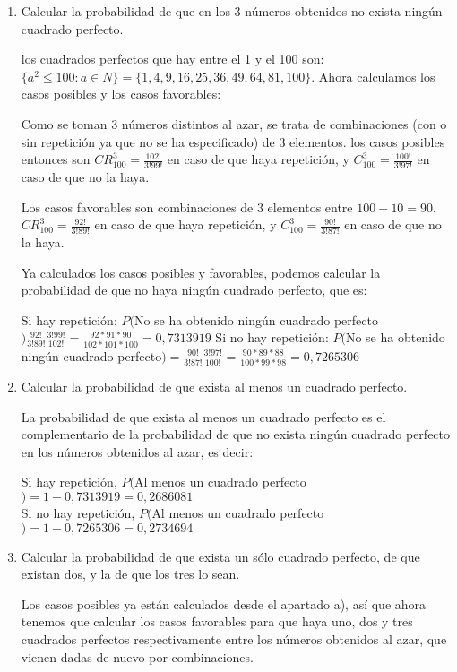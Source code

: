 \documentclass[a4paper,12pt]{article}
\begin{document}
\begin{enumerate}
    \begin{enumerate}[label=\alph*)]
    \item Calcular la probabilidad de que en los 3 números obtenidos no exista ningún cuadrado perfecto.

    los cuadrados perfectos que hay entre el 1 y el 100 son: $\{ a^2 \leq 100 : a \in N\} =\{ 1,4, 9, 16,25, 36, 49,64, 81, 100\}$. Ahora calculamos los casos posibles y los casos favorables:

    Como se toman 3 números distintos al azar, se trata de combinaciones (con o sin repetición ya que no se ha especificado) de 3 elementos. los casos posibles entonces son $CR_{100}^3=\frac{102!}{3!99!}$ en caso de que haya repetición, y $C_{100}^3=\frac{100!}{3!97!}$ en caso de que no la haya.

    Los casos favorables son combinaciones de 3 elementos entre $100-10=90$. $CR_{100}^3=\frac{92!}{3!89!}$ en caso de que haya repetición, y $C_{100}^3=\frac{90!}{3!87!}$ en caso de que no la haya.

    Ya calculados los casos posibles y favorables, podemos calcular la probabilidad de que no haya ningún cuadrado perfecto, que es:

    Si hay repetición: $P($No se ha obtenido ningún cuadrado perfecto$)\frac{92!}{3!89!} \frac{3!99!}{102!} = \frac{92*91*90}{102*101*100} = 0,7313919$
    Si no hay repetición: $P($No se ha obtenido ningún cuadrado perfecto$)=\frac{90!}{3!87!}\frac{3!97!}{100!}=\frac{90*89*88}{100*99*98}=0,7265306$\\
    
    \item Calcular la probabilidad de que exista al menos un cuadrado perfecto.

    La probabilidad de que exista al menos un cuadrado perfecto es el complementario de la probabilidad de que no exista ningún cuadrado perfecto en los números obtenidos al azar, es decir:

    Si hay repetición, $P($Al menos un cuadrado perfecto$)= 1 - 0,7313919 = 0,2686081$\\
    Si no hay repetición, $P($Al menos un cuadrado perfecto$)= 1 -0,7265306 = 0,2734694$\\
    \item Calcular la probabilidad de que exista un sólo cuadrado perfecto, de que existan dos, y la de que los tres lo sean.

    Los casos posibles ya están calculados desde el apartado a), así que ahora tenemos que calcular los casos favorables para que haya uno, dos y tres cuadrados perfectos respectivamente entre los números obtenidos al azar, que vienen dadas de nuevo por combinaciones.


\end{enumerate}
\end{enumerate}
\end{document}
